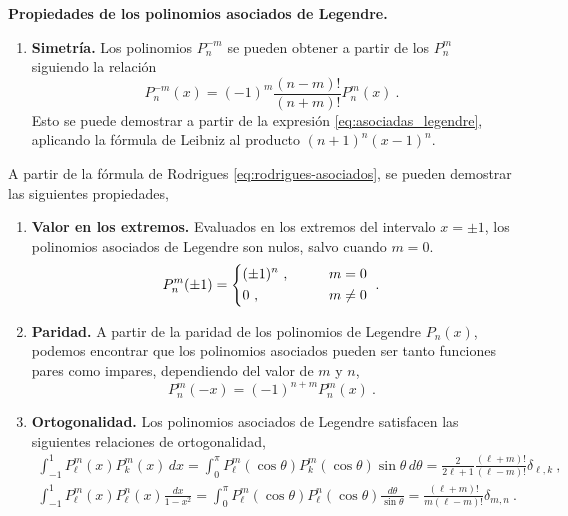 \begin{propiedad}
    \textbf{Propiedades de los polinomios asociados de Legendre.}

    \begin{enumerate}[series=asociadas]
        \item \textbf{Simetría.} Los polinomios $P^{-m}_n$ se pueden obtener a partir de los $P^{m}_n$ siguiendo la relación
        \begin{equation}
            P^{-m}_n(x) = (-1)^m \frac{(n-m)!}{(n+m)!}P^{m}_n(x) \ .
        \end{equation}
        Esto se puede demostrar a partir de la expresión \eqref{eq:asociadas_legendre}, aplicando la fórmula de Leibniz al producto $(n+1)^n (x-1)^n$.
    \end{enumerate}

    A partir de la fórmula de Rodrigues \eqref{eq:rodrigues-asociados}, se pueden demostrar las siguientes propiedades,
    \begin{enumerate}[resume=asociadas]
        \item \textbf{Valor en los extremos.} Evaluados en los extremos del intervalo $x= \pm 1$, los polinomios asociados de Legendre son nulos, salvo cuando $m=0$.
        \begin{equation}
            P_n^m(\pm 1) = \begin{dcases}
                (\pm 1)^n \ , & \qquad m = 0 \\
                0 \ , & \qquad m \neq 0
            \end{dcases} \ .
        \end{equation}

        \item \textbf{Paridad.} A partir de la paridad de los polinomios de Legendre $P_n(x)$, podemos encontrar que los polinomios asociados pueden ser tanto funciones pares como impares, dependiendo del valor de $m$ y $n$,
        \begin{equation}
            P_n^m(-x) = (-1)^{n+m} P_n^m(x) \ .
        \end{equation}

        \item \textbf{Ortogonalidad.} Los polinomios asociados de Legendre satisfacen las siguientes relaciones de ortogonalidad,
        \begin{gather}
            \int_{-1}^1 P_\ell^m(x) P_k^m(x) \, dx = \int_0^\pi P_\ell^m(\cos\theta) P_k^m(\cos\theta) \sin\theta \, d\theta = \frac{2}{2\ell + 1} \frac{(\ell + m)!}{(\ell - m)!} \delta_{\ell, k} \ , \\
            \int_{-1}^1 P_\ell^m(x) P_\ell^n(x) \frac{dx}{1-x^2} = \int_0^\pi P_\ell^m(\cos\theta) P_\ell^n(\cos\theta) \frac{d\theta}{\sin \theta} = \frac{(\ell+m)!}{m(\ell-m)!} \delta_{m,n} \ .
        \end{gather}


\end{enumerate}
\end{propiedad}

